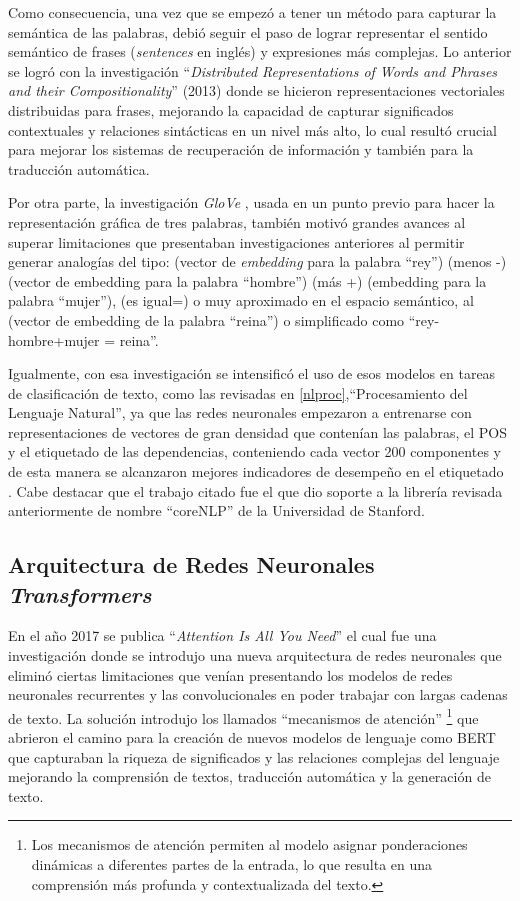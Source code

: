 \documentclass[
  12pt,
  openany]{book}
\begin{document}
Como consecuencia, una vez que se empezó a tener un método para capturar la semántica de las palabras, debió seguir el paso de lograr representar el sentido semántico de frases (\emph{sentences} en inglés) y expresiones más complejas. Lo anterior se logró con la investigación ``\emph{Distributed Representations of Words and Phrases and their Compositionality}'' (2013) \citep{mikolov2013a} donde se hicieron representaciones vectoriales distribuidas para frases, mejorando la capacidad de capturar significados contextuales y relaciones sintácticas en un nivel más alto, lo cual resultó crucial para mejorar los sistemas de recuperación de información y también para la traducción automática.

Por otra parte, la investigación \emph{GloVe} \citep{pennington2014}, usada en un punto previo para hacer la representación gráfica de tres palabras, también motivó grandes avances al superar limitaciones que presentaban investigaciones anteriores al permitir generar analogías del tipo: (vector de \emph{embedding} para la palabra ``rey'') (menos -) (vector de embedding para la palabra ``hombre'') (más +) (embedding para la palabra ``mujer''), (es igual=) o muy aproximado en el espacio semántico, al (vector de embedding de la palabra ``reina'') o simplificado como ``rey-hombre+mujer = reina''.

Igualmente, con esa investigación se intensificó el uso de esos modelos en tareas de clasificación de texto, como las revisadas en \ref{nlproc},``Procesamiento del Lenguaje Natural'', ya que las redes neuronales empezaron a entrenarse con representaciones de vectores de gran densidad que contenían las palabras, el POS y el etiquetado de las dependencias, conteniendo cada vector 200 componentes y de esta manera se alcanzaron mejores indicadores de desempeño en el etiquetado \citep{chen2014}. Cabe destacar que el trabajo citado fue el que dio soporte a la librería revisada anteriormente de nombre ``coreNLP'' de la Universidad de Stanford.

\hypertarget{trans}{%
\subsection{\texorpdfstring{Arquitectura de Redes Neuronales \emph{Transformers}}{Arquitectura de Redes Neuronales Transformers}}\label{trans}}

En el año 2017 se publica ``\emph{Attention Is All You Need}'' \citep{vaswani2017} el cual fue una investigación donde se introdujo una nueva arquitectura de redes neuronales que eliminó ciertas limitaciones que venían presentando los modelos de redes neuronales recurrentes y las convolucionales en poder trabajar con largas cadenas de texto. La solución introdujo los llamados ``mecanismos de atención'' \footnote{Los mecanismos de atención permiten al modelo asignar ponderaciones dinámicas a diferentes partes de la entrada, lo que resulta en una comprensión más profunda y contextualizada del texto.} que abrieron el camino para la creación de nuevos modelos de lenguaje como BERT \citep{devlin2018} que capturaban la riqueza de significados y las relaciones complejas del lenguaje mejorando la comprensión de textos, traducción automática y la generación de texto.
\end{document}
